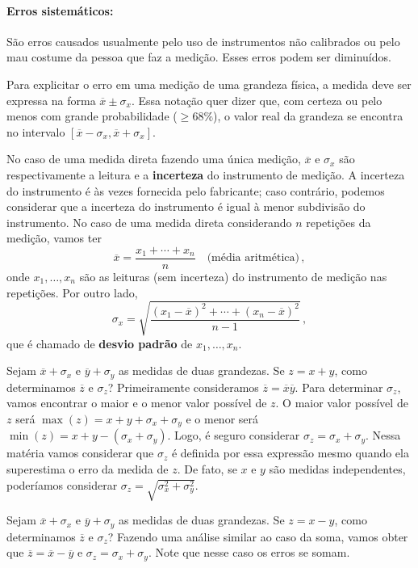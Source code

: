 \documentclass[12pt, a4paper]{article}
\begin{document}
\paragraph{Erros sistemáticos:} São erros causados usualmente pelo uso de instrumentos não calibrados ou pelo mau costume da pessoa que faz a medição. Esses erros podem ser diminuídos.

Para explicitar o erro em uma medição de uma grandeza física, a medida deve ser expressa na forma $\overline{x}\pm \sigma_x$. Essa notação quer dizer que, com certeza ou pelo menos com grande probabilidade ($\ge 68\%$), o valor real da grandeza se encontra no intervalo $[\overline{x}-\sigma_x, \overline{x}+\sigma_x]$. 

No caso de uma medida direta fazendo uma única medição, $\overline{x}$ e $\sigma_x$ são respectivamente a leitura e a \textbf{incerteza} do instrumento de medição. A incerteza do instrumento é às vezes fornecida pelo fabricante; caso contrário, podemos considerar que a incerteza do instrumento é igual à menor subdivisão do instrumento. No caso de uma medida direta considerando $n$ repetições da medição, vamos ter 
$$\overline{x}=\frac{x_1+\cdots+x_n}{n}\quad\text{(média aritmética)}\,,$$
onde $x_1,\ldots,x_n$ são as leituras (sem incerteza) do instrumento de medição nas repetições. Por outro lado,
$$\sigma_x=\sqrt{\frac{(x_1-\overline{x})^2+\cdots+(x_n-\overline{x})^2}{n-1}}\,,$$
que é chamado de \textbf{desvio padrão} de $x_1,\ldots,x_n$.

Sejam $\overline{x}+\sigma_x$ e $\overline{y}+\sigma_y$ as medidas de duas grandezas. Se $z=x+y$, como determinamos $\overline{z}$ e $\sigma_z$? Primeiramente consideramos $\overline{z}=\overline{x}\overline{y}$. Para determinar $\sigma_z$, vamos encontrar o maior e o menor valor possível de $z$. O maior valor possível de $z$ será $\max(z)=x+y+\sigma_x+\sigma_y$ e o menor será $\min(z)=x+y-(\sigma_x+\sigma_y)$. Logo, é seguro considerar $\sigma_z=\sigma_x+\sigma_y$. Nessa matéria vamos considerar que $\sigma_z$ é definida por essa expressão mesmo quando ela superestima o erro da medida de $z$. De fato, se $x$ e $y$ são medidas independentes, poderíamos considerar $\sigma_z=\sqrt{\sigma_x^2+\sigma_y^2}$.

Sejam $\overline{x}+\sigma_x$ e $\overline{y}+\sigma_y$ as medidas de duas grandezas. Se $z=x-y$, como determinamos $\overline{z}$ e $\sigma_z$? Fazendo uma análise similar ao caso da soma, vamos obter que $\overline{z}=\overline{x}-\overline{y}$ e $\sigma_z=\sigma_x+\sigma_y$. Note que nesse caso os erros se somam.
\end{document}

